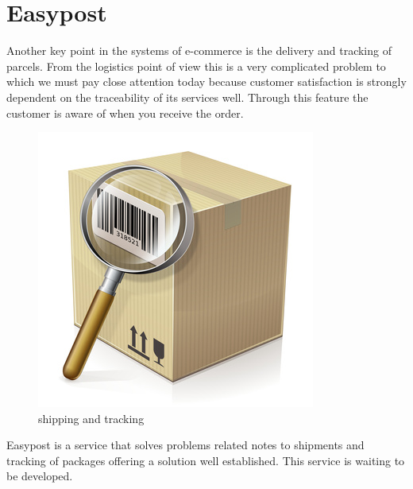 \section{Easypost}
\label{sec:easypost}
Another key point in the systems of e-commerce is the delivery and tracking of parcels. From the logistics point of view this is a very complicated problem to which we must pay close attention today because customer satisfaction is strongly dependent on the traceability of its services well. Through this feature the customer is aware of when you receive the order.
\begin{figure}[htb]
  \centering
  \includegraphics[width=0.3\linewidth]{images/chapter2/shipment-tracking.jpg}\hfill
  \caption[shipping and tracking]{shipping and tracking}
\label{fig:shipping_tracking}
\end{figure}
Easypost is a service that solves problems related notes to shipments and tracking of packages offering a solution well established. This service is waiting to be developed.